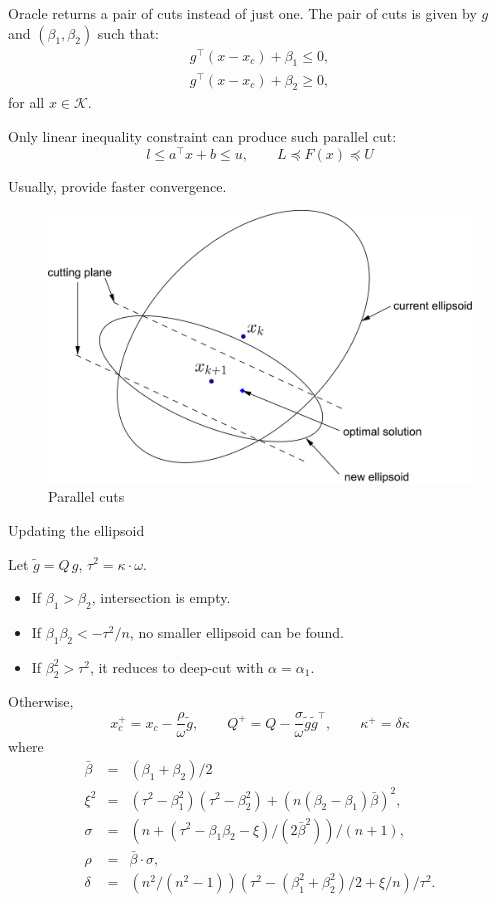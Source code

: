 \documentclass[final,leqno]{siamltex}
\providecommand{\tightlist}{%
  \setlength{\itemsep}{0pt}\setlength{\parskip}{0pt}}
\begin{document}
Oracle returns a pair of cuts instead of just one.
The pair of cuts is given by \(g\) and \((\beta_1, \beta_2)\) such that:
\[\begin{array}{l}
    g^\top (x - x_c) + \beta_1 \leq 0,  \\
    g^\top (x - x_c) + \beta_2 \geq 0,
  \end{array}
\]
for all \(x \in \mathcal{K}\).

Only linear inequality constraint can produce such parallel cut:
\[ l \leq a^\top x + b \leq u, \qquad L \preceq F(x) \preceq U
\]

Usually, provide faster convergence.

\begin{figure}
\hypertarget{fig:parallel_cut}{%
\centering
\includegraphics{ellipsoid.files/parallel_cut.pdf}
\caption{Parallel cuts}\label{fig:parallel_cut}
}
\end{figure}

Updating the ellipsoid

Let \(\tilde{g} = Q\,g\), \(\tau^2 = \kappa\cdot\omega\).

\begin{itemize}
\tightlist
\item
  If \(\beta_1 > \beta_2\), intersection is empty.
\item
  If \(\beta_1 \beta_2 < -\tau^2/n\), no smaller ellipsoid can be found.
\item
  If \(\beta_2^2 > \tau^2\), it reduces to deep-cut with \(\alpha = \alpha_1\).
\end{itemize}

Otherwise,
\[x_c^+ = x_c - \frac{\rho}{\omega} \tilde{g}, \qquad
    Q^+ = Q - \frac{\sigma}{\omega} \tilde{g}\tilde{g}^\top, \qquad
    \kappa^+ =  \delta \kappa
\]
where
\[\begin{array}{lll}
      \bar{\beta} &=& (\beta_1 + \beta_2)/2 \\
      \xi^2 &=& (\tau^2 - \beta_1^2)(\tau^2 - \beta_2^2) + (n(\beta_2 - \beta_1)\bar{\beta})^2, \\
      \sigma &=& (n + (\tau^2 - \beta_1\beta_2 - \xi)/(2\bar{\beta}^2)) / (n + 1), \\
      \rho &=& \bar{\beta}\cdot\sigma, \\
      \delta &=& (n^2/(n^2-1)) (\tau^2 - (\beta_1^2 + \beta_2^2)/2 + \xi/n) / \tau^2 .
\end{array}
\]
\end{document}
